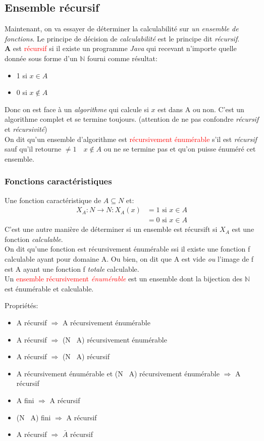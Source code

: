 \documentclass{report}
\begin{document}
\subsection{Ensemble récursif}
Maintenant, on va essayer de déterminer la calculabilité sur \textit{un ensemble de fonctions}.
Le principe de décision de \textit{calculabilité} est le principe dit \textit{récursif}.\\
\textbf{A} est \textcolor{red}{récursif} si il existe un programme \textit{Java} qui recevant n'importe quelle donnée sous forme d'un $\mathbb{N}$ fourni comme résultat:
\begin{itemize}
\item 1 si $x \in A$
\item 0 si $x \notin A$
\end{itemize}
Donc on est face à un \textit{algorithme} qui calcule si $x$ est dans A ou non. C'est un algorithme complet et se termine toujours. (attention de ne pas confondre \textit{récursif} et \textit{récursivité})\\

On dit qu'un ensemble d'algorithme est \textcolor{red}{récursivement énumérable} s'il est \textit{récursif} sauf qu'il retourne $\neq 1 \quad x \notin A$ ou ne se termine pas et qu'on puisse énuméré cet ensemble.

\subsubsection{Fonctions caractéristiques} \label{caract}
Une fonction caractéristique de $A \subseteq N$ et:
\begin{align}
X_A : N \rightarrow N : X_A(x) &= 1 \text{ si } x \in A\\
&= 0 \text{ si } x \in A
\end{align} 
C'est une autre manière de déterminer si un ensemble est récursift si $X_A$ est une fonction \textit{calculable}.\\
On dit qu'une fonction est récursivement énumérable ssi il existe une fonction f calculable ayant pour domaine A. Ou bien, on dit que A est vide \textit{ou} l'image de f est A ayant une fonction f \textit{totale} calculable.\\
Un \textcolor{red}{ensemble récursivement \textit{énumérable}} est un ensemble dont la bijection des $\mathbb{N}$ est énumérable et calculable.

Propriétés:
\begin{itemize}
\item A récursif $\Rightarrow$ A récursivement énumérable 
\item A récursif $\Rightarrow$ (N \ A) récursivement énumérable 
\item A récursif $\Rightarrow$ (N \ A) récursif 
\item A récursivement énumérable et (N \ A) récursivement énumérable $\Rightarrow$ A récursif 
\item A fini $\Rightarrow$ A récursif
\item (N \ A) fini $\Rightarrow$ A récursif
\item A récursif $\Rightarrow$ $\bar{A}$ récursif
\end{itemize}
\end{document}
